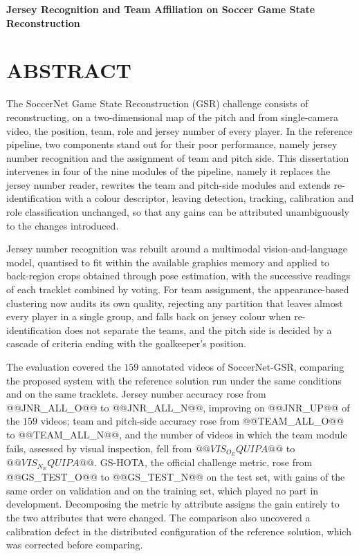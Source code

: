 \begingroup
\begin{flushleft}
\bfseries
{}
{\Large
Jersey Recognition and Team Affiliation on Soccer Game State Reconstruction}

\mdseries
\end{flushleft}
\normalsize
\let\clearpage\relax
\chapter{ABSTRACT}
\endgroup

\noindent The SoccerNet Game State Reconstruction (GSR) challenge consists of reconstructing, on a
two-dimensional map of the pitch and from single-camera video, the position, team, role and jersey
number of every player. In the reference pipeline, two components stand out for their poor
performance, namely jersey number recognition and the assignment of team and pitch side. This
dissertation intervenes in four of the nine modules of the pipeline, namely it replaces the jersey number
reader, rewrites the team and pitch-side modules and extends re-identification with a colour
descriptor, leaving detection, tracking, calibration and role classification unchanged, so that
any gains can be attributed unambiguously to the changes introduced.

Jersey number recognition was rebuilt around a multimodal vision-and-language model, quantised to
fit within the available graphics memory and applied to back-region crops obtained through pose
estimation, with the successive readings of each tracklet combined by voting. For team assignment,
the appearance-based clustering now audits its own quality, rejecting any partition that leaves
almost every player in a single group, and falls back on jersey colour when
re-identification does not separate the teams, and the pitch side is decided by a cascade of
criteria ending with the goalkeeper's position.

The evaluation covered the $159$ annotated videos of SoccerNet-GSR, comparing the proposed system
with the reference solution run under the same conditions and on the same tracklets. Jersey number
accuracy rose from @@JNR_ALL_O@@ to @@JNR_ALL_N@@, improving on @@JNR_UP@@ of the $159$ videos;
team and pitch-side accuracy rose from @@TEAM_ALL_O@@ to @@TEAM_ALL_N@@, and the number of videos in
which the team module fails, assessed by visual inspection, fell from $@@VIS_O_EQUIPA@@$ to
$@@VIS_N_EQUIPA@@$. GS-HOTA, the official challenge metric, rose from @@GS_TEST_O@@ to @@GS_TEST_N@@
on the test set, with gains of the same order on validation and on the training set, which played
no part in development. Decomposing the metric by attribute assigns the gain entirely to the two
attributes that were changed. The comparison also uncovered a calibration defect in the distributed
configuration of the reference solution, which was corrected before comparing.

